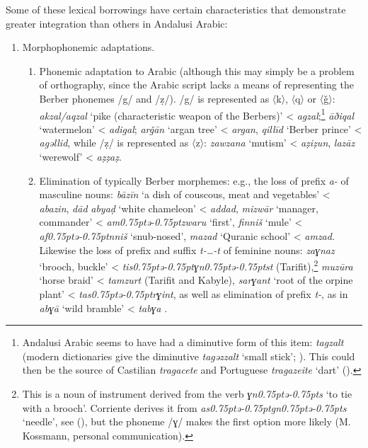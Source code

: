 \documentclass[output=paper,modfonts,nonflat]{langsci/langscibook}
\begin{document}
Some of these lexical borrowings have certain characteristics that demonstrate greater integration than others in Andalusi Arabic: 

\begin{enumerate}
\item Morphophonemic adaptations.

\begin{enumerate}
\item Phonemic adaptation to Arabic (although this may simply be a problem of orthography, since the Arabic script lacks a means of representing the Berber phonemes /g/ and /ẓ/). /g/ is represented as 〈k〉, 〈q〉 or 〈ǧ〉: \textit{akzal/aqzal} ‘pike (characteristic weapon of the Berbers)’ < \textit{agzal};\footnote{Andalusi Arabic seems to have had a diminutive form of this item: \textit{tagzalt} (modern dictionaries give the diminutive \textit{tagǝzzalt} ‘small stick’; \citealt{Taïfi1991}). This could then be the source of Castilian \textit{tragacete} and Portuguese \textit{tragazeite} ‘dart’ (\citealt{CorrientePereiraVicenteforthcoming}).}  \textit{āðiqal} ‘watermelon’ < \textit{adigal}; \textit{arǧān} ‘argan tree’ < \textit{argan}, \textit{qillīd} ‘Berber prince’ < \textit{agǝllid}, while /ẓ/ is represented as 〈z〉: \textit{zawzana} ‘mutism’ < \textit{aẓiẓun}, \textit{lazāz} ‘werewolf’ < \textit{aẓẓaẓ}. 

\item Elimination of typically Berber morphemes: e.g., the loss of prefix \textit{a-} of masculine nouns: \textit{bāzīn} ‘a dish of couscous, meat and vegetables’ < \textit{abazin}, \textit{dād} \textit{abyaḍ} ‘white chameleon’ < \textit{addad}, \textit{mizwār} ‘manager, commander’ < \textit{am\kern 0.75ptǝ\kern -0.75ptzwaru} ‘first’, \textit{finniš} `mule' < \textit{af\kern 0.75ptǝ\kern -0.75ptnniš} `snub-nosed', \textit{mazad} ‘Quranic school’ < \textit{amzad}. Likewise the loss of prefix and suffix \textit{t-…-t} of feminine nouns: \textit{zaɣnaz} ‘brooch, buckle’ < \textit{tis\kern 0.75ptǝ\kern -0.75ptɣn\kern 0.75ptǝ\kern -0.75ptst} (Tarifit),\footnote{This is a noun of instrument derived from the verb \textit{ɣn\kern 0.75ptǝ\kern -0.75pts} ‘to tie with a brooch’. Corriente derives it from \textit{as\kern 0.75ptǝ\kern -0.75ptgn\kern 0.75ptǝ\kern -0.75pts} ‘needle’, see (\citealt{CorrientePereiraVicenteforthcoming}), but the phoneme /ɣ/ makes the first option more likely (M. Kossmann, personal communication).} \textit{muzūra} ‘horse braid’ < \textit{tamzurt} (Tarifit and Kabyle), \textit{sarɣant} ‘root of the orpine plant’ < \textit{tas\kern 0.75ptǝ\kern -0.75ptrɣint}, as well as elimination of prefix \textit{t-}, as in \textit{abɣā} ‘wild bramble’ < \textit{tabɣa} . 
\end{enumerate}


\end{enumerate}
\end{document}
